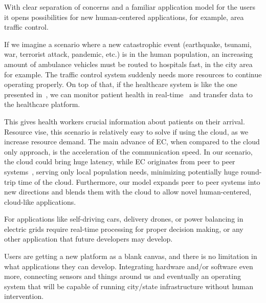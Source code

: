 With clear separation of concerns and a familiar application model for the users it opens possibilities for new human-centered applications, for example, area traffic control. 

If we imagine a scenario where a new catastrophic event (earthquake, tsunami, war, terrorist attack, pandemic, etc.) is in the human population, an increasing amount of ambulance vehicles must be routed to hospitals fast, in the city area for example. The traffic control system suddenly needs more resources to continue operating properly. On top of that, if the healthcare system is like the one presented in~\cite{OmarBBKR19, inproceedingsSimic5}, we can monitor patient health in real-time~\cite{Al-KhafajiyBCAK19} and transfer data to the healthcare platform. 

This gives health workers crucial information about patients on their arrival. Resource vise, this scenario is relatively easy to solve if using the cloud, as we increase resource demand. The main advance of EC, when compared to the cloud only approach, is the acceleration of the communication speed. In our scenario, the cloud could bring huge latency, while EC originates from peer to peer systems~\cite{LopezMEDHIBFR15}, serving only local population needs, minimizing potentially huge round-trip time of the cloud. Furthermore, our model expands peer to peer systems into new directions and blends them with the cloud to allow novel human-centered, cloud-like applications. 

For applications like self-driving cars, delivery drones, or power balancing in electric grids require real-time processing for proper decision making, or any other application that future developers may develop.

Users are getting a new platform as a blank canvas, and there is no limitation in what applications they can develop. Integrating hardware and/or software even more, connecting sensors and things around us and eventually an operating system that will be capable of running city/state infrastructure without human intervention.
%
%